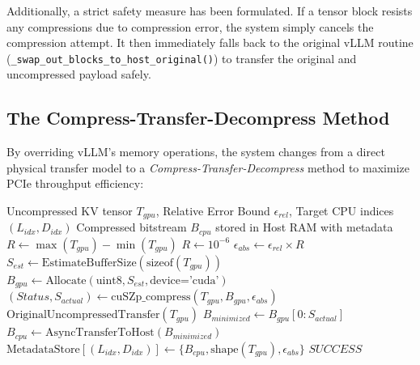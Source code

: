 \documentclass{polyu-comp}
\begin{document}
Additionally, a strict safety measure has been formulated. If a tensor block resists any compressions due to compression error, the system simply cancels the compression attempt. It then immediately falls back to the original vLLM routine (\texttt{\_swap\_out\_blocks\_to\_host\_original()}) to transfer the original and uncompressed payload safely.

\subsection{The Compress-Transfer-Decompress Method}
By overriding vLLM's memory operations, the system changes from a direct physical transfer model to a \textit{Compress-Transfer-Decompress} method to maximize PCIe throughput efficiency:

\begin{algorithm}[htbp]
\caption{Dynamic Error-Bounded Compressed Swap-Out Pipeline}
\label{alg:swap_out}
\begin{algorithmic}[1]
\REQUIRE Uncompressed KV tensor $T_{gpu}$, Relative Error Bound $\epsilon_{rel}$, Target CPU indices $(L_{idx}, D_{idx})$
\ENSURE Compressed bitstream $B_{cpu}$ stored in Host RAM with metadata
\STATE $R \gets \max(T_{gpu}) - \min(T_{gpu})$ 
    \STATE $R \gets 10^{-6}$ 
\ENDIF
\STATE $\epsilon_{abs} \gets \epsilon_{rel} \times R$ 
\STATE $S_{est} \gets \text{EstimateBufferSize}(\text{sizeof}(T_{gpu}))$
\STATE $B_{gpu} \gets \text{Allocate}(\text{uint8}, S_{est}, \text{device='cuda'})$
\STATE $(Status, S_{actual}) \gets \text{cuSZp\_compress}(T_{gpu}, B_{gpu}, \epsilon_{abs})$
    \RETURN $\text{OriginalUncompressedTransfer}(T_{gpu})$
\ENDIF
\STATE $B_{minimized} \gets B_{gpu}[0 : S_{actual}]$ 
\STATE $B_{cpu} \gets \text{AsyncTransferToHost}(B_{minimized})$
\STATE $\text{MetadataStore}[(L_{idx}, D_{idx})] \gets \{ B_{cpu}, \text{shape}(T_{gpu}), \epsilon_{abs} \}$
\RETURN $SUCCESS$
\end{algorithmic}
\end{algorithm}
\end{document}

